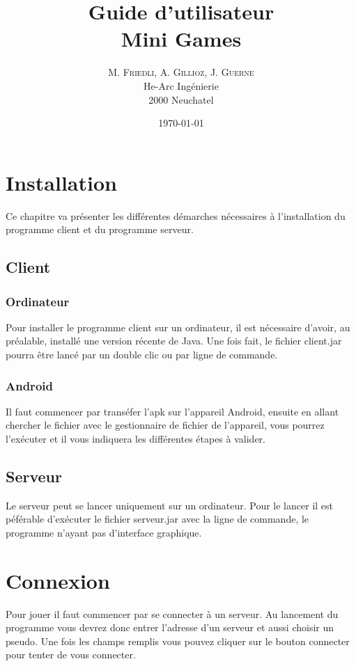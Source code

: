 \documentclass{report}
\title{\Huge Guide d'utilisateur \\ \huge Mini Games }
\author{M. \textsc{Friedli}, A. \textsc{Gillioz}, J. \textsc{Guerne}\\
He-Arc Ingénierie\\
2000 Neuchatel}
\date{\today{}}
\begin{document}
\maketitle

\chapter{Installation}
Ce chapitre va présenter les différentes démarches nécessaires à l'installation du
programme client et du programme serveur.
\section{Client}

\subsection{Ordinateur}
Pour installer le programme client sur un ordinateur, il est nécessaire d'avoir, au préalable, installé une version récente de Java.
Une fois fait, le fichier client.jar pourra être lancé par un double clic ou par ligne de commande.

\subsection{Android}
Il faut commencer par transéfer l'apk sur l'appareil Android, ensuite en allant chercher le fichier avec le gestionnaire de fichier de
l'appareil, vous pourrez l'exécuter et il vous indiquera les différentes étapes à valider.

\section{Serveur}
Le serveur peut se lancer uniquement sur un ordinateur. Pour le lancer il est péférable d'exécuter le fichier serveur.jar avec la ligne de commande, le programme n'ayant
pas d'interface graphique.


\chapter{Connexion}
Pour jouer il faut commencer par se connecter à un serveur.
Au lancement du programme vous devrez donc entrer l'adresse d'un serveur et aussi choisir un pseudo. Une fois les champs remplis vous pouvez cliquer sur le bouton connecter pour tenter de vous connecter.
\end{document}
